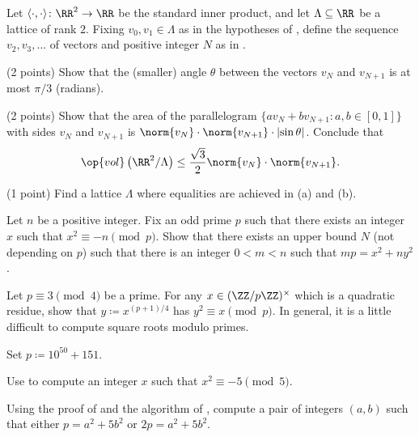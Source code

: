 \documentclass[../notes.tex]{subfiles}
\begin{document}
\begin{prob}[6 points]
	Let $\langle\cdot,\cdot\rangle\colon\RR^2\to\RR$ be the standard inner product, and let $\Lambda\subseteq\RR$ be a lattice of rank $2$. Fixing $v_0,v_1\in\Lambda$ as in the hypotheses of , define the sequence $v_2,v_3,\ldots$ of vectors and positive integer $N$ as in .
	\begin{listalph}
		\item (2 points) Show that the (smaller) angle $\theta$ between the vectors $v_N$ and $v_{N+1}$ is at most $\pi/3$ (radians).
		\item (2 points) Show that the area of the parallelogram $\{av_N+bv_{N+1}:a,b\in[0,1]\}$ with sides $v_N$ and $v_{N+1}$ is $\norm{v_N}\cdot\norm{v_{N+1}}\cdot\left|\sin\theta\right|$. Conclude that
		\[\op{vol}\left(\RR^2/\Lambda\right)\le\frac{\sqrt3}2\norm{v_N}\cdot\norm{v_{N+1}}.\]
		\item (1 point) Find a lattice $\Lambda$ where equalities are achieved in (a) and (b).
	\end{listalph}
\end{prob}
\begin{prob}[6 points]
	Let $n$ be a positive integer. Fix an odd prime $p$ such that there exists an integer $x$ such that $x^2\equiv-n\pmod p$. Show that there exists an upper bound $N$ (not depending on $p$) such that there is an integer $0<m<n$ such that $mp=x^2+ny^2$.
\end{prob}
\begin{prob}[2 points] \label{prob:3-mod-4-square-root}
	Let $p\equiv3\pmod4$ be a prime. For any $x\in(\ZZ/p\ZZ)^\times$ which is a quadratic residue, show that $y\coloneqq x^{(p+1)/4}$ has $y^2\equiv x\pmod p$. In general, it is a little difficult to compute square roots modulo primes.
\end{prob}
\begin{prob}[8 points] \label{prob:explicit-primes-of-form-5}
	Set $p\coloneqq10^{50}+151$.
	\begin{listalph}
		\item Use  to compute an integer $x$ such that $x^2\equiv-5\pmod5$.
		\item Using the proof of  and the algorithm of , compute a pair of integers $(a,b)$ such that either $p=a^2+5b^2$ or $2p=a^2+5b^2$.
	\end{listalph}
\end{prob}
\end{document}
